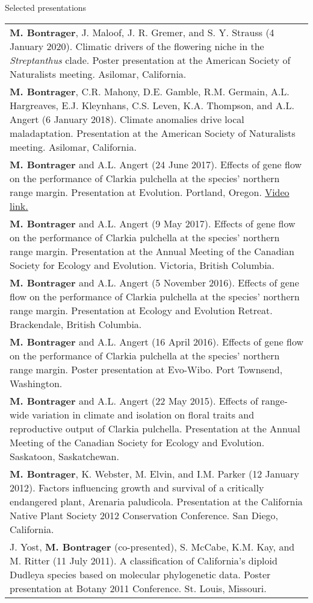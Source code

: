\documentclass[letterpaper,11pt,oneside]{article}
\begin{document}

\noindent\Large{Selected presentations}  
\normalsize
\bigskip

\def\arraystretch{1.2}
\noindent \begin{tabular}{@{} >{\raggedright\arraybackslash}p{16.51cm}}
\textbf{M. Bontrager}, J. Maloof, J. R. Gremer, and S. Y. Strauss (4 January 2020). Climatic drivers of the flowering niche in the \textit{Streptanthus} clade. Poster presentation at the American Society of Naturalists meeting. Asilomar, California. \\
\textbf{M. Bontrager}, C.R. Mahony, D.E. Gamble, R.M. Germain, A.L. Hargreaves, E.J. Kleynhans, C.S. Leven, K.A. Thompson, and A.L. Angert (6 January 2018). Climate anomalies drive local maladaptation. Presentation at the American Society of Naturalists meeting. Asilomar, California. \\
\textbf{M. Bontrager} and A.L. Angert (24 June 2017). Effects of gene flow on the performance of Clarkia pulchella at the species’ northern range margin. Presentation at Evolution. Portland, Oregon. \href{https://www.youtube.com/watch?v=HqVgQzIJLyA}{Video link.} \\
\textbf{M. Bontrager} and A.L. Angert (9 May 2017). Effects of gene flow on the performance of Clarkia pulchella at the species’ northern range margin. Presentation at the Annual Meeting of the Canadian Society for Ecology and Evolution. Victoria, British Columbia. \\
\textbf{M. Bontrager} and A.L. Angert (5 November 2016). Effects of gene flow on the performance of Clarkia pulchella at the species’ northern range margin. Presentation at Ecology and Evolution Retreat. Brackendale, British Columbia. \\
\textbf{M. Bontrager} and A.L. Angert (16 April 2016). Effects of gene flow on the performance of Clarkia pulchella at the species’ northern range margin. Poster presentation at Evo-Wibo. Port Townsend, Washington. \\
\textbf{M. Bontrager} and A.L. Angert (22 May 2015). Effects of range-wide variation in climate and isolation on floral traits and reproductive output of Clarkia pulchella. Presentation at the Annual Meeting of the Canadian Society for Ecology and Evolution. Saskatoon, Saskatchewan. \\
\textbf{M. Bontrager}, K. Webster, M. Elvin, and I.M. Parker (12 January 2012). Factors influencing growth and survival of a critically endangered plant, Arenaria paludicola. Presentation at the California Native Plant Society 2012 Conservation Conference. San Diego, California. \\
J. Yost, \textbf{M. Bontrager} (co-presented), S. McCabe, K.M. Kay, and M. Ritter (11 July 2011). A classification of California’s diploid Dudleya species based on molecular phylogenetic data. Poster presentation at Botany 2011 Conference. St. Louis, Missouri. \\
\end{tabular}
\bigskip
\bigskip
\end{document}
